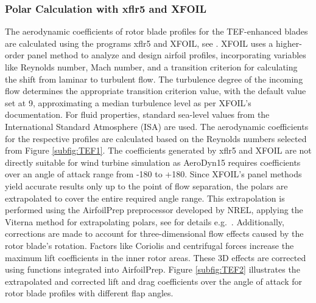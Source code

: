 \subsubsection{Polar Calculation with xflr5 and XFOIL}
The aerodynamic coefficients of rotor blade profiles for the TEF-enhanced blades are calculated using the programs xflr5 and XFOIL, see \cite{drela1989xfoil}. XFOIL uses a higher-order panel method to analyze and design airfoil profiles, incorporating variables like Reynolds number, Mach number, and a transition criterion for calculating the shift from laminar to turbulent flow. The turbulence degree of the incoming flow determines the appropriate transition criterion value, with the default value set at 9, approximating a median turbulence level as per XFOIL's documentation. For fluid properties, standard sea-level values from the International Standard Atmosphere (ISA) are used. The aerodynamic coefficients for the respective profiles are calculated based on the Reynolds numbers selected from Figure \ref{subfig:TEF1}. The coefficients generated by xflr5 and XFOIL are not directly suitable for wind turbine simulation as AeroDyn15 requires coefficients over an angle of attack range from -180\textdegree{} to +180\textdegree. Since XFOIL's panel methods yield accurate results only up to the point of flow separation, the polars are extrapolated to cover the entire required angle range. This extrapolation is performed using the AirfoilPrep preprocessor developed by NREL, applying the Viterna method for extrapolating polars, see for details e.g.~\cite{gasch2011wind}. %
Additionally, corrections are made to account for three-dimensional flow effects caused by the rotor blade's rotation. Factors like Coriolis and centrifugal forces increase the maximum lift coefficients in the inner rotor areas. These 3D effects are corrected using functions integrated into AirfoilPrep. Figure \ref{subfig:TEF2} illustrates the extrapolated and corrected lift and drag coefficients over the angle of attack for rotor blade profiles with different flap angles. 

